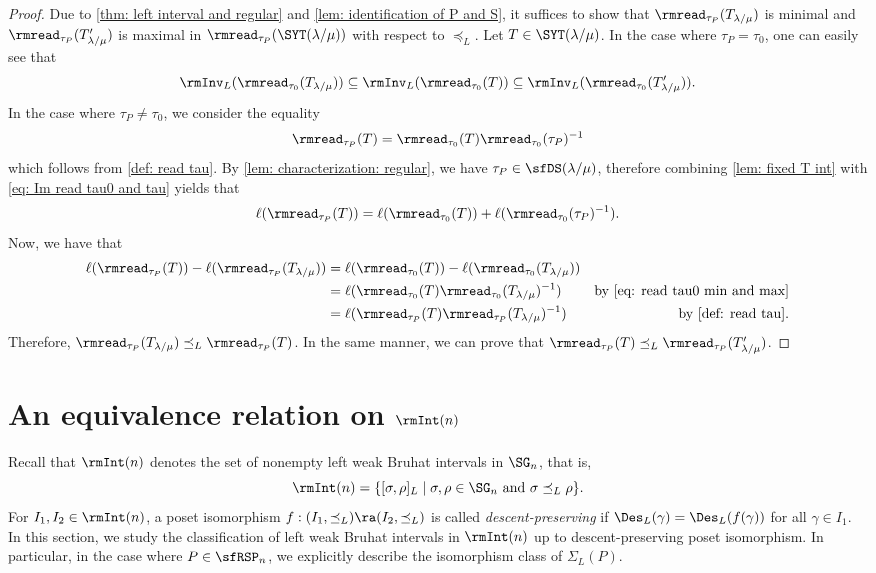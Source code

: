 \documentclass[12pt, reqno]{amsart}
\theoremstyle{definition}
\numberwithin{equation}{section} \numberwithin{figure}{section}
\numberwithin{table}{section}
\begin{document}
\begin{proof}
Due to \cref{thm: left interval and regular} and \cref{lem: identification of P and S},
it suffices to show that $\rmread_{\tau_P}(T_{\lambda/\mu})$ is minimal and $\rmread_{\tau_P}(T'_{\lambda/\mu})$ is maximal in $\rmread_{\tau_P}(\SYT(\lambda/\mu))$ with respect to $\preceq_L$.
Let $T \in \SYT(\lambda / \mu)$.
In the case where $\tau_P = \tau_0$,
one can easily see that
\begin{align}\label{eq: read tau0 min and max}
\rmInv_L(\rmread_{\tau_0}(T_{\lambda/\mu})) 
\subseteq \rmInv_L(\rmread_{\tau_0}(T))
\subseteq
\rmInv_L(\rmread_{\tau_0}(T_{\lambda/\mu}')). 
\end{align}
In the case where $\tau_P \neq \tau_0$, we consider the equality
\begin{align}\label{eq: Im read tau0 and tau}
\rmread_{\tau_P}(T) = \rmread_{\tau_0}(T)
\rmread_{\tau_0}(\tau_P)^{-1}
\end{align}
which follows from \cref{def: read tau}.
By \cref{lem: characterization: regular}, we have $\tau_P \in \sfDS(\lambda/\mu)$, 
therefore combining \cref{lem: fixed T int} with \cref{eq: Im read tau0 and tau} yields that
\begin{align*}
\ell(\rmread_{\tau_P}(T)) = \ell(\rmread_{\tau_0}(T)) + \ell(\rmread_{\tau_0}(\tau_P)^{-1}).
\end{align*}
Now, we have that
\begin{align*}
\ell(\rmread_{\tau_P}(T)) - \ell(\rmread_{\tau_P}(T_{\lambda/\mu}))
& =
\ell(\rmread_{\tau_0}(T)) - \ell(\rmread_{\tau_0}(T_{\lambda/\mu}))  
\\
& =
\ell(\rmread_{\tau_0}(T) \rmread_{\tau_0}(T_{\lambda/\mu})^{-1}) 
& \text{by \cref{eq: read tau0 min and max}} \\
& =
\ell(\rmread_{\tau_P}(T) \rmread_{\tau_P}(T_{\lambda/\mu})^{-1})
& \text{by \cref{def: read tau}}.
\end{align*}
Therefore, $\rmread_{\tau_P}(T_{\lambda/\mu}) \preceq_L \rmread_{\tau_P}(T)$.
In the same manner, we can prove that
$\rmread_{\tau_P}(T) \preceq_L \rmread_{\tau_P}(T'_{\lambda/\mu})$.
\end{proof}



\section{An equivalence relation on $\rmInt(n)$} 
\label{sec: interval equal upto desc pres iso}


Recall that  $\rmInt(n)$ denotes the set of nonempty left weak Bruhat intervals in $\SG_n$, that is,
$$
\rmInt(n) = \{[\sigma,\rho]_L \mid 
\sigma,\rho \in \SG_n \text{ and } \sigma \preceq_L \rho\}.
$$
For $I_1, I_2 \in \rmInt(n)$, a poset isomorphism $f: (I_1, \preceq_L) \ra (I_2, \preceq_L)$ is called  \emph{descent-preserving} if $\Des_L(\gamma) = \Des_L(f(\gamma))$ for all $\gamma \in I_1$.
In this section, we study the classification of left weak Bruhat intervals in $\rmInt(n)$ up to descent-preserving poset isomorphism.
In particular, in the case where $P \in \sfRSP_n$, we explicitly describe the isomorphism class of $\Sigma_L(P)$.
\end{document}
